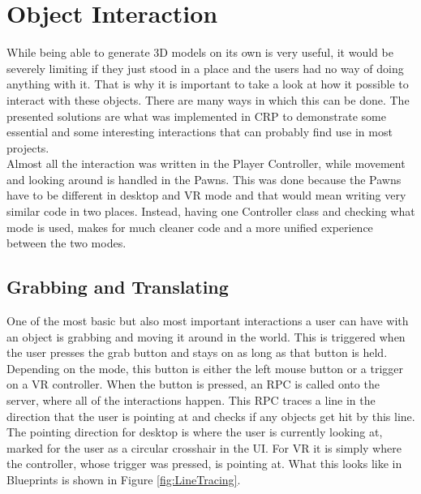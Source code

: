 

\section{Object Interaction}\label{chp:ObjectInteraction}
While being able to generate 3D models on its own is very useful, it would be severely limiting if they just stood in a place and the users had no way of doing anything with it. That is why it is important to take a look at how it possible to interact with these objects. There are many ways in which this can be done. The presented solutions are what was implemented in \acs{CRP} to demonstrate some essential and some interesting interactions that can probably find use in most projects.\\
Almost all the interaction was written in the Player Controller, while movement and looking around is handled in the Pawns. This was done because the Pawns have to be different in desktop and VR mode and that would mean writing very similar code in two places. Instead, having one Controller class and checking what mode is used, makes for much cleaner code and a more unified experience between the two modes.
\subsection{Grabbing and Translating}

One of the most basic but also most important interactions a user can have with an object is grabbing and moving it around in the world. This is triggered when the user presses the grab button and stays on as long as that button is held. Depending on the mode, this button is either the left mouse button or a trigger on a \acs{VR} controller. When the button is pressed, an \acs{RPC} is called onto the server, where all of the interactions happen. This \acs{RPC} traces a line in the direction that the user is pointing at and checks if any objects get hit by this line. The pointing direction for desktop is where the user is currently looking at, marked for the user as a circular crosshair in the UI. For VR it is simply where the controller, whose trigger was pressed, is pointing at. What this looks like in Blueprints is shown in Figure \ref{fig:LineTracing}.


